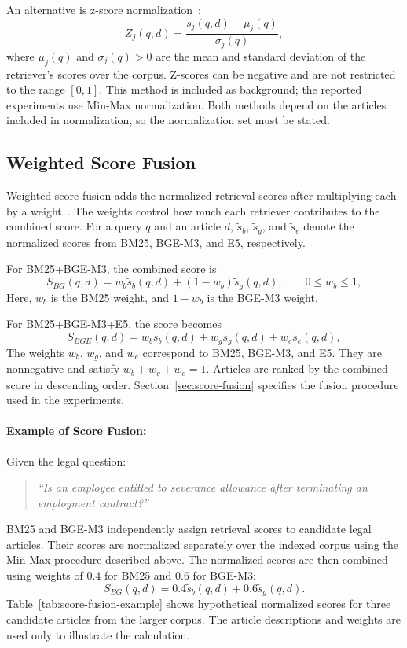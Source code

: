 An alternative is z-score normalization~\cite{bruch2022}:
\[
Z_j(q,d)=\frac{s_j(q,d)-\mu_j(q)}{\sigma_j(q)},
\]
where \(\mu_j(q)\) and \(\sigma_j(q)>0\) are the mean and standard deviation of the retriever's scores over the corpus. Z-scores can be negative and are not restricted to the range \([0,1]\). This method is included as background; the reported experiments use Min-Max normalization. Both methods depend on the articles included in normalization, so the normalization set must be stated.

\subsection{Weighted Score Fusion}
\label{sec:weighted-score-fusion}

Weighted score fusion adds the normalized retrieval scores after multiplying each by a weight~\cite{bruch2022}. The weights control how much each retriever contributes to the combined score. For a query \(q\) and an article \(d\), \(\widetilde{s}_b\), \(\widetilde{s}_g\), and \(\widetilde{s}_e\) denote the normalized scores from BM25, BGE-M3, and E5, respectively.

For BM25+BGE-M3, the combined score is
\[
S_{BG}(q,d)=w_b\widetilde{s}_b(q,d)+(1-w_b)\widetilde{s}_g(q,d),
\qquad 0\leq w_b\leq1,
\]
Here, \(w_b\) is the BM25 weight, and \(1-w_b\) is the BGE-M3 weight. 

For BM25+BGE-M3+E5, the score becomes
\[
S_{BGE}(q,d)=w_b\widetilde{s}_b(q,d)+w_g\widetilde{s}_g(q,d)+w_e\widetilde{s}_e(q,d),
\]
The weights \(w_b\), \(w_g\), and \(w_e\) correspond to BM25, BGE-M3, and E5. They are nonnegative and satisfy \(w_b+w_g+w_e=1\). Articles are ranked by the combined score in descending order. Section~\ref{sec:score-fusion} specifies the fusion procedure used in the experiments.

\paragraph{Example of Score Fusion:}
Given the legal question:
\begin{quote}
    \emph{``Is an employee entitled to severance allowance after terminating an employment contract?''}
\end{quote}
BM25 and BGE-M3 independently assign retrieval scores to candidate legal articles. Their scores are normalized separately over the indexed corpus using the Min-Max procedure described above. The normalized scores are then combined using weights of 0.4 for BM25 and 0.6 for BGE-M3:
\[
S_{BG}(q,d)=0.4\widetilde{s}_b(q,d)+0.6\widetilde{s}_g(q,d).
\]
Table~\ref{tab:score-fusion-example} shows hypothetical normalized scores for three candidate articles from the larger corpus. The article descriptions and weights are used only to illustrate the calculation.

